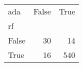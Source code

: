 \begin{tabular}{lrr}
\toprule
ada &  False &  True  \\
rf    &        &        \\
\midrule
False &     30 &     14 \\
True  &     16 &    540 \\
\bottomrule
\end{tabular}
